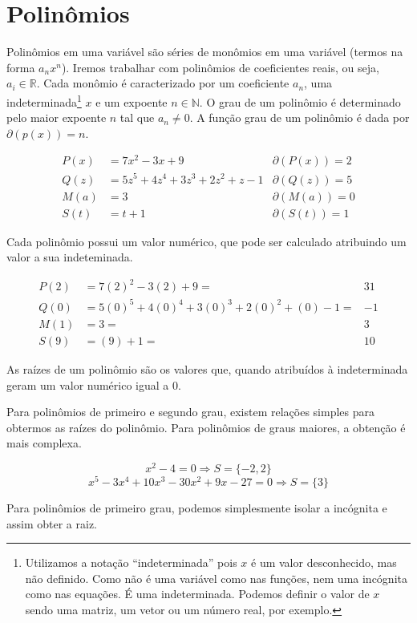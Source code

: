 \chapter{Polinômios}
\begin{df}
Polinômios em uma variável são séries de monômios em uma variável (termos na forma $a_nx^n$). Iremos trabalhar com polinômios de coeficientes reais, ou seja, $a_i \in \mathbb{R}$. Cada monômio é caracterizado por um coeficiente $a_n$, uma indeterminada\footnote{Utilizamos a notação ``indeterminada'' pois $x$ é um valor desconhecido, mas não definido. Como não é uma variável como nas funções, nem uma incógnita como nas equações. É uma indeterminada. Podemos definir o valor de $x$ sendo uma matriz, um vetor ou um número real, por exemplo.} $x$ e um expoente $n \in \mathbb{N}$. O grau de um polinômio é determinado pelo maior expoente $n$ tal que $a_n \neq 0$. A função grau de um polinômio é dada por $\partial (p(x))=n$.
\end{df}
\begin{exemplo}
\begin{align*}
P(x)&=7x^2-3x+9 &\partial(P(x))=2\\
Q(z)&=5z^5+4z^4+3z^3+2z^2+z-1 &\partial(Q(z))=5\\
M(a)&=3 &\partial(M(a))=0\\
S(t)&=t+1 &\partial(S(t))=1
\end{align*}
\end{exemplo}
Cada polinômio possui um valor numérico, que pode ser calculado atribuindo um valor a sua indeteminada.
\begin{exemplo}
\begin{align*}
P(2)&=7(2)^2-3(2)+9=&31\\
Q(0)&=5(0)^5+4(0)^4+3(0)^3+2(0)^2+(0)-1=&-1\\
M(1)&=3=&3\\
S(9)&=(9)+1=&10
\end{align*}
\end{exemplo}
As raízes de um polinômio são os valores que, quando atribuídos à indeterminada geram um valor numérico igual a 0. \par 
Para polinômios de primeiro e segundo grau, existem relações simples para obtermos as raízes do polinômio. Para polinômios de graus maiores, a obtenção é mais complexa.%
\begin{exemplo}
\[x^2-4=0 \Rightarrow S=\{-2, 2\} \]
\[x^5-3x^4+10x^3-30x^2+9x-27=0 \Rightarrow S=\{3\}\]
\end{exemplo}
Para polinômios de primeiro grau, podemos simplesmente isolar a incógnita e assim obter a raiz. \par 

